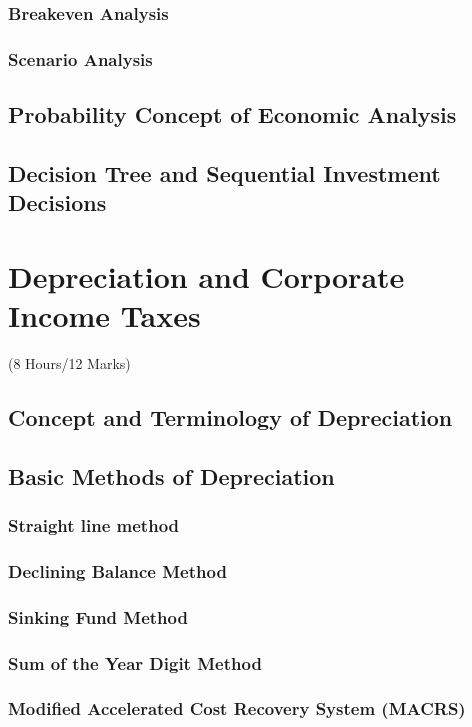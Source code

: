 \documentclass[12pt]{article}
\begin{document}
\subsubsection{Breakeven Analysis}
\subsubsection{Scenario Analysis}
\subsection{Probability Concept of Economic Analysis}
\subsection{Decision Tree and Sequential Investment Decisions}

\pagebreak
\section{Depreciation and Corporate Income Taxes}	
\begin{center}(8 Hours/12 Marks)\end{center}
\subsection{Concept and Terminology of Depreciation}
\subsection{Basic Methods of Depreciation}
\subsubsection{Straight line method}
\subsubsection{Declining Balance Method}
\subsubsection{Sinking Fund Method}
\subsubsection{Sum of the Year Digit Method}
\subsubsection{Modified Accelerated Cost Recovery System (MACRS)}
\end{document}
